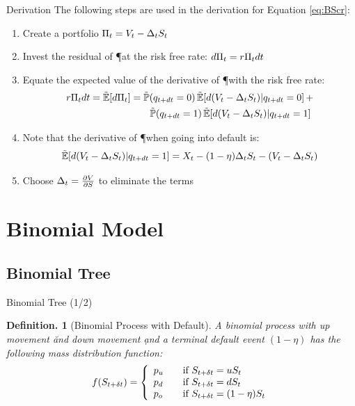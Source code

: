 \documentclass{beamer}
\newtheorem{defn}[thm]{Definition.}
\begin{document}
\begin{frame}{Derivation}
The following steps are used in the derivation for Equation \ref{eq:BScr}:
\begin{enumerate}
 \item Create a portfolio $\Pi_t = V_t - \Delta_tS_t$
 \item Invest the residual of \P at the risk free rate: $d\Pi_t = r\Pi_tdt$
 \item Equate the expected value of the derivative of \P with the risk free rate:
       \begin{align}
        r\P\dt = \E[\dP] &= \Prob(\qdt = 0) \E[d(\V - \D\S)|\qdt = 0] + \n
                         &\qquad \Prob(\qdt = 1) \E[d(\V - \D\S)|\qdt = 1]
       \end{align}
 \item Note that the derivative of \P when going into default is:
       \begin{equation}
        \E[d(\V - \D\S)|\qdt = 1] = \X - (1 - \eta)\D\S -(\V - \D\S) \label{eq:dPx}
       \end{equation}
 \item Choose $\Delta_t = \frac{\partial V}{\partial S}$ to eliminate the \dW terms
\end{enumerate}
\end{frame}



\section{Binomial Model} %


\subsection{Binomial Tree}

\begin{frame}{Binomial Tree (1/2)}
\begin{defn}[Binomial Process with Default]
A binomial process with up movement \u and down movement \d and a terminal default event $(1 - \eta)$ has the following mass distribution function:
\begin{equation}
 f(\SDt) = \left\{\begin{array}{l@{\qquad\mbox{if }}l} \pu & \SDt = u\S \\ \pd & \SDt = d\S \\ \po & \SDt = (1 - \eta)\S \end{array} \right.
\end{equation}
\end{defn}
\end{frame}
\end{document}
